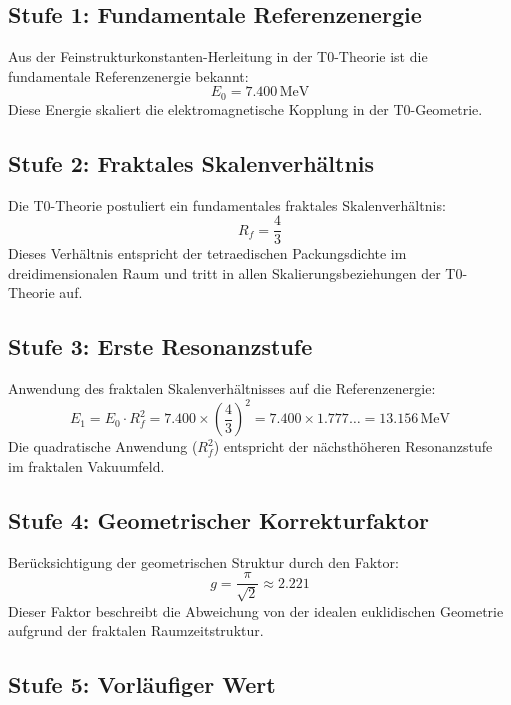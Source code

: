 \documentclass[12pt,a4paper]{article}
\begin{document}
	\subsection{Stufe 1: Fundamentale Referenzenergie}
	
	Aus der Feinstrukturkonstanten-Herleitung in der T0-Theorie ist die fundamentale Referenzenergie bekannt:
	\begin{equation}
		E_0 = 7.400\,\text{MeV}
	\end{equation}
	Diese Energie skaliert die elektromagnetische Kopplung in der T0-Geometrie.
	
	\subsection{Stufe 2: Fraktales Skalenverhältnis}
	
	Die T0-Theorie postuliert ein fundamentales fraktales Skalenverhältnis:
	\begin{equation}
		R_f = \frac{4}{3}
	\end{equation}
	Dieses Verhältnis entspricht der tetraedischen Packungsdichte im dreidimensionalen Raum und tritt in allen Skalierungsbeziehungen der T0-Theorie auf.
	
	\subsection{Stufe 3: Erste Resonanzstufe}
	
	Anwendung des fraktalen Skalenverhältnisses auf die Referenzenergie:
	\begin{equation}
		E_1 = E_0 \cdot R_f^2 = 7.400 \times \left(\frac{4}{3}\right)^2 = 7.400 \times 1.777\ldots = 13.156\,\text{MeV}
	\end{equation}
	Die quadratische Anwendung ($R_f^2$) entspricht der nächsthöheren Resonanzstufe im fraktalen Vakuumfeld.
	
	\subsection{Stufe 4: Geometrischer Korrekturfaktor}
	
	Berücksichtigung der geometrischen Struktur durch den Faktor:
	\begin{equation}
		g = \frac{\pi}{\sqrt{2}} \approx 2.221
	\end{equation}
	Dieser Faktor beschreibt die Abweichung von der idealen euklidischen Geometrie aufgrund der fraktalen Raumzeitstruktur.
	
	\subsection{Stufe 5: Vorläufiger Wert}
	
\end{document}
